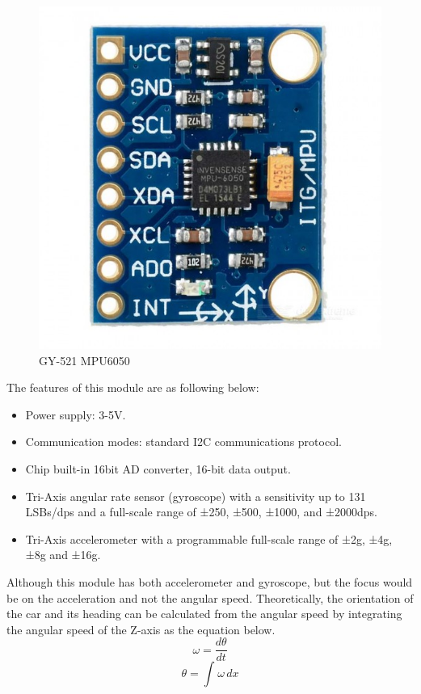 \begin{figure}[h]
    \centering
    \includegraphics[scale=.5]{figure/5-2.jpeg}
    \caption{GY-521 MPU6050}
    \label{fig:mpu6050}
\end{figure}

The features of this module are as following below:
\begin{itemize}
    \item Power supply: 3-5V.
    \item Communication modes: standard I2C communications protocol.
    \item Chip built-in 16bit AD converter, 16-bit data output.
    \item Tri-Axis angular rate sensor (gyroscope) with a sensitivity up to 131 LSBs/dps and a full-scale range of ±250, ±500, ±1000, and ±2000dps.
    \item Tri-Axis accelerometer with a programmable full-scale range of ±2g, ±4g, ±8g and ±16g.
\end{itemize}

Although this module has both accelerometer and gyroscope, but the focus would be on the acceleration and not the angular speed.
Theoretically, the orientation of the car and its heading can be calculated from the angular speed by integrating the angular speed of the Z-axis as the equation below.
\[ \omega = \frac{d \theta}{dt}\]
\[ \theta = \int_{}^{} \omega \,dx \]

